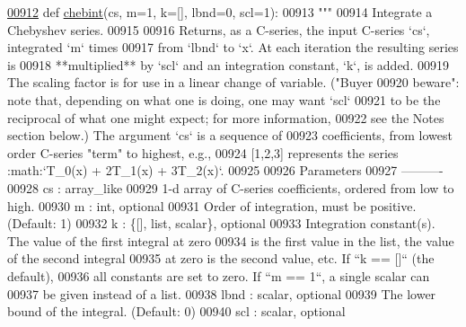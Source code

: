 \begin{DoxyCode}
\hypertarget{namespacepyneb_1_1utils_1_1chebyshev_l00912}{}\hyperlink{namespacepyneb_1_1utils_1_1chebyshev_a233e686a07b9935c74ce1e053f0c5f5f}{00912} \textcolor{keyword}{def }\hyperlink{namespacepyneb_1_1utils_1_1chebyshev_a233e686a07b9935c74ce1e053f0c5f5f}{chebint}(cs, m=1, k=[], lbnd=0, scl=1):
00913     \textcolor{stringliteral}{"""}
00914 \textcolor{stringliteral}{    Integrate a Chebyshev series.}
00915 \textcolor{stringliteral}{}
00916 \textcolor{stringliteral}{    Returns, as a C-series, the input C-series `cs`, integrated `m` times}
00917 \textcolor{stringliteral}{    from `lbnd` to `x`.  At each iteration the resulting series is}
00918 \textcolor{stringliteral}{    **multiplied** by `scl` and an integration constant, `k`, is added.}
00919 \textcolor{stringliteral}{    The scaling factor is for use in a linear change of variable.  ("Buyer}
00920 \textcolor{stringliteral}{    beware": note that, depending on what one is doing, one may want `scl`}
00921 \textcolor{stringliteral}{    to be the reciprocal of what one might expect; for more information,}
00922 \textcolor{stringliteral}{    see the Notes section below.)  The argument `cs` is a sequence of}
00923 \textcolor{stringliteral}{    coefficients, from lowest order C-series "term" to highest, e.g.,}
00924 \textcolor{stringliteral}{    [1,2,3] represents the series :math:`T\_0(x) + 2T\_1(x) + 3T\_2(x)`.}
00925 \textcolor{stringliteral}{}
00926 \textcolor{stringliteral}{    Parameters}
00927 \textcolor{stringliteral}{    ----------}
00928 \textcolor{stringliteral}{    cs : array\_like}
00929 \textcolor{stringliteral}{        1-d array of C-series coefficients, ordered from low to high.}
00930 \textcolor{stringliteral}{    m : int, optional}
00931 \textcolor{stringliteral}{        Order of integration, must be positive. (Default: 1)}
00932 \textcolor{stringliteral}{    k : \{[], list, scalar\}, optional}
00933 \textcolor{stringliteral}{        Integration constant(s).  The value of the first integral at zero}
00934 \textcolor{stringliteral}{        is the first value in the list, the value of the second integral}
00935 \textcolor{stringliteral}{        at zero is the second value, etc.  If ``k == []`` (the default),}
00936 \textcolor{stringliteral}{        all constants are set to zero.  If ``m == 1``, a single scalar can}
00937 \textcolor{stringliteral}{        be given instead of a list.}
00938 \textcolor{stringliteral}{    lbnd : scalar, optional}
00939 \textcolor{stringliteral}{        The lower bound of the integral. (Default: 0)}
00940 \textcolor{stringliteral}{    scl : scalar, optional}

\end{DoxyCode}
